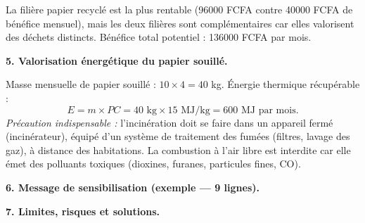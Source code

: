\documentclass[11pt]{article}
\begin{document}
\begin{exoresolu}
La filière papier recyclé est la plus rentable (\num{96000} FCFA contre \num{40000} FCFA de bénéfice mensuel), mais les deux filières sont complémentaires car elles valorisent des déchets distincts. Bénéfice total potentiel : \num{136000} FCFA par mois.

\textbf{5. Valorisation énergétique du papier souillé.}

Masse mensuelle de papier souillé : $10 \times 4 = 40$ kg.
Énergie thermique récupérable :
\[ E = m \times PC = 40 \text{ kg} \times 15 \text{ MJ/kg} = 600 \text{ MJ par mois.} \]
\emph{Précaution indispensable :} l'incinération doit se faire dans un appareil fermé (incinérateur), équipé d'un système de traitement des fumées (filtres, lavage des gaz), à distance des habitations. La combustion à l'air libre est interdite car elle émet des polluants toxiques (dioxines, furanes, particules fines, CO).

\textbf{6. Message de sensibilisation (exemple — 9 lignes).}

\begin{center}
\end{center}

\textbf{7. Limites, risques et solutions.}


\end{exoresolu}
\end{document}

